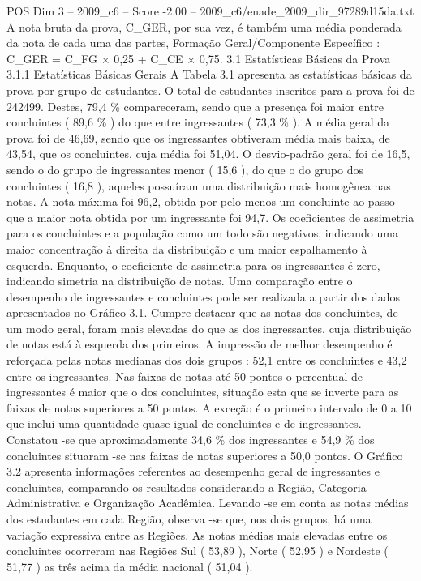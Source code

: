 \begin{textsample}{POS Dim 3 – 2009\_c6 – Score -2.00 – 2009\_c6/enade\_2009\_dir\_97289d15da.txt}
A nota bruta da prova, C\_GER, por sua vez, é também uma média ponderada da nota de cada uma das partes, Formação Geral/Componente Específico : C\_GER = C\_FG × 0,25 + C\_CE × 0,75. 3.1 Estatísticas Básicas da Prova 3.1.1 Estatísticas Básicas Gerais A Tabela 3.1 apresenta as estatísticas básicas da prova por grupo de estudantes.
O total de estudantes inscritos para a prova foi de 242499.
Destes, 79,4 \% compareceram, sendo que a presença foi maior entre concluintes ( 89,6 \% ) do que entre ingressantes ( 73,3 \% ).
A média geral da prova foi de 46,69, sendo que os ingressantes obtiveram média mais baixa, de 43,54, que os concluintes, cuja média foi 51,04.
O desvio-padrão geral foi de 16,5, sendo o do grupo de ingressantes menor ( 15,6 ), do que o do grupo dos concluintes ( 16,8 ), aqueles possuíram uma distribuição mais homogênea nas notas.
A nota máxima foi 96,2, obtida por pelo menos um concluinte ao passo que a maior nota obtida por um ingressante foi 94,7.
Os coeficientes de assimetria para os concluintes e a população como um todo são negativos, indicando uma maior concentração à direita da distribuição e um maior espalhamento à esquerda.
Enquanto, o coeficiente de assimetria para os ingressantes é zero, indicando simetria na distribuição de notas.
Uma comparação entre o desempenho de ingressantes e concluintes pode ser realizada a partir dos dados apresentados no Gráfico 3.1.
Cumpre destacar que as notas dos concluintes, de um modo geral, foram mais elevadas do que as dos ingressantes, cuja distribuição de notas está à esquerda dos primeiros.
A impressão de melhor desempenho é reforçada pelas notas medianas dos dois grupos : 52,1 entre os concluintes e 43,2 entre os ingressantes.
Nas faixas de notas até 50 pontos o percentual de ingressantes é maior que o dos concluintes, situação esta que se inverte para as faixas de notas superiores a 50 pontos.
A exceção é o primeiro intervalo de 0 a 10 que inclui uma quantidade quase igual de concluintes e de ingressantes.
Constatou -se que aproximadamente 34,6 \% dos ingressantes e 54,9 \% dos concluintes situaram -se nas faixas de notas superiores a 50,0 pontos.
O Gráfico 3.2 apresenta informações referentes ao desempenho geral de ingressantes e concluintes, comparando os resultados considerando a Região, Categoria Administrativa e Organização Acadêmica.
Levando -se em conta as notas médias dos estudantes em cada Região, observa -se que, nos dois grupos, há uma variação expressiva entre as Regiões.
As notas médias mais elevadas entre os concluintes ocorreram nas Regiões Sul ( 53,89 ), Norte ( 52,95 ) e Nordeste ( 51,77 ) as três acima da média nacional ( 51,04 ).

\end{textsample}
